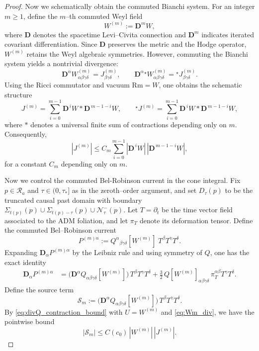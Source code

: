 \documentclass{amsart}
\begin{document}
{\begin{proof}
\medskip
\noindent Now we schematically obtain the commuted Bianchi system.
For an integer $m\ge 1$, define the $m$--th commuted Weyl field
\[
W^{(m)}:=\mathbf D^{m}W,
\]
where $\mathbf D$ denotes the spacetime Levi--Civita connection and $\mathbf D^{m}$ indicates iterated covariant
differentiation.  Since $\mathbf D$ preserves the metric and the Hodge operator, $W^{(m)}$ retains the Weyl
algebraic symmetries.  However, commuting the Bianchi system yields a nontrivial divergence:
\begin{equation}
\label{eq:Wm_div}
\mathbf D^\alpha W^{(m)}_{\alpha\beta\gamma\delta}=J^{(m)}_{\beta\gamma\delta},
\qquad
\mathbf D^\alpha {}^\star W^{(m)}_{\alpha\beta\gamma\delta}={}^\star J^{(m)}_{\beta\gamma\delta}.
\end{equation}
Using the Ricci commutator and vacuum $\mathrm{Rm}=W$, one obtains the schematic structure
\begin{equation}
\label{eq:Jm_structure}
J^{(m)}=\sum_{i=0}^{m-1}\mathbf D^{\,i}W * \mathbf D^{\,m-1-i}W,
\qquad
{}^\star J^{(m)}=\sum_{i=0}^{m-1}\mathbf D^{\,i}W * \mathbf D^{\,m-1-i}W,
\end{equation}
where $*$ denotes a universal finite sum of contractions depending only on $m$.
Consequently,
\begin{equation}
\label{eq:Jm_pointwise_bound}
|J^{(m)}|\le C_{m}\sum_{i=0}^{m-1}|\mathbf D^{\,i}W|\,|\mathbf D^{\,m-1-i}W|,
\end{equation}
for a constant $C_{m}$ depending only on $m$.

\medskip

\noindent Now we control the commuted Bel-Robinson current in the cone integral.
Fix $p\in\mathcal{R}_{a}$ and $\tau\in(0,\tau_{*}]$ as in the zeroth--order argument, and set
$D_{\tau}(p)$ to be the truncated causal past domain with boundary
$\Sigma_{t(p)}(p)\cup \Sigma_{t(p)-\tau}(p)\cup \mathcal{N}^{-}_{\tau}(p)$.
Let $T=\partial_{t}$ be the time vector field associated to the ADM foliation, and let $\pi_{T}$ denote its
deformation tensor.  Define the commuted Bel--Robinson current
\[
P^{(m)\alpha}:=Q^\alpha{}_{\beta\gamma\delta}[W^{(m)}]\;T^\beta T^\gamma T^\delta.
\]
Expanding $\mathbf D_\alpha P^{(m)\alpha}$ by the Leibniz rule and using symmetry of $Q$, one has the exact identity
\begin{align}
\label{eq:divPm_exact}
\mathbf D_\alpha P^{(m)\alpha}
&=
\big(\mathbf D^\alpha Q_{\alpha\beta\gamma\delta}[W^{(m)}]\big)\,T^\beta T^\gamma T^\delta
+\frac{3}{2}\,Q[W^{(m)}]_{\alpha\beta\gamma\delta}\,\pi_T^{\alpha\beta}T^\gamma T^\delta.
\end{align}
Define the source term
\[
\mathcal S_{m}:=
\big(\mathbf D^\alpha Q_{\alpha\beta\gamma\delta}[W^{(m)}]\big)\,T^\beta T^\gamma T^\delta.
\]
By \eqref{eq:divQ_contraction_bound} with $U=W^{(m)}$ and \eqref{eq:Wm_div}, we have the pointwise bound
\begin{equation}
\label{eq:Sm_exact_bound}
|\mathcal S_{m}|\le C(c_{0})\,|W^{(m)}|\,|J^{(m)}|.
\end{equation}


\end{proof}}
\end{document}
